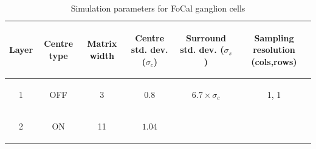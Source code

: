 \documentclass{frontiersENG} %
\newenvironment{mycell}[1]
{
	\begin{minipage}{#1}
		\begin{center}
			\vspace*{0.15cm}
		}
		{
			\vspace*{0.1cm}
		\end{center}
	\end{minipage}
}
\newenvironment{mycellS}[1]
{
  \begin{minipage}{#1}
    \begin{center}
    }
    {
      \vspace*{0.01cm}
    \end{center}
  \end{minipage}
}
\begin{document}
\begin{table}[htb]
	\caption{Simulation parameters for FoCal ganglion cells}
	\begin{center}
		
		
		
		\begin{tabular}{c c c c c c}
			\begin{mycellS}{0.8cm}\centering Layer \end{mycellS}& 
			\begin{mycellS}{1.1cm}\centering Centre type\end{mycellS}& 
			\begin{mycellS}{1.1cm}\centering Matrix width \end{mycellS}&  
			\begin{mycellS}{1.6cm}\centering Centre std. dev. ($\sigma_c$)\end{mycellS} & 
			\begin{mycellS}{1.6cm}\centering Surround std. dev. ($\sigma_s$)\end{mycellS} & 
			\begin{mycellS}{1.3cm}\centering Sampling resolution (cols,rows)\end{mycellS} \\
			\hline
			\begin{mycell}{0.8cm} 1  \end{mycell} &
			\begin{mycell}{1.1cm} \textsc{OFF} \end{mycell}& 
			\begin{mycell}{1.1cm} 3 \end{mycell}& 
			\begin{mycell}{1.6cm}$0.8$ \end{mycell}& 
      \begin{mycell}{1.6cm}$6.7 \times \sigma_c$ \end{mycell}&  
      \begin{mycell}{1.6cm}1, 1 \end{mycell}\\
			\begin{mycell}{0.8cm} 2 \end{mycell} & 
			\begin{mycell}{1.1cm} \textsc{ON} \end{mycell} & 
			\begin{mycell}{1.1cm} 11 \end{mycell}& 
			\begin{mycell}{1.6cm}$1.04$ \end{mycell}& 

\end{tabular}
\end{center}
\end{table}
\end{document}
